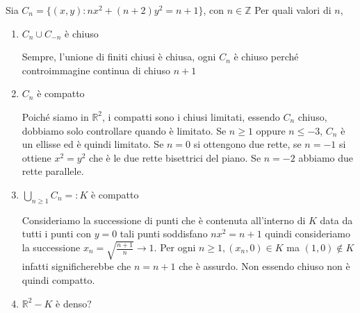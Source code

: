 \begin{example}
    Sia \(C_n = \{ (x, y) : nx^2 + (n+2)y^2 = n+1\} \), con \(n \in \mathbb{Z}\) 
    Per quali valori di \(n\),
\begin{enumerate}[label = \arabic*.]
    \item \(C_n \cup C_{-n}\) è chiuso

        Sempre, l'unione di finiti chiusi è chiusa, ogni \(C_n\) è chiuso
        perché controimmagine continua di chiuso \(n+1\) 
    \item \(C_n\) è compatto

        Poiché siamo in \(\mathbb{R}^{2}\), i compatti sono i chiusi limitati,
        essendo \(C_n\) chiuso, dobbiamo solo controllare quando è limitato. Se
        \(n \ge 1\) oppure \(n \le -3\), \(C_n\) è un ellisse ed è quindi limitato.
        Se \(n = 0\) si ottengono due rette, se \(n = -1\) si ottiene \(x^2 =
        y^2 \) che è le due rette bisettrici del piano. Se \(n = -2\) abbiamo due
        rette parallele.

    \item \(\bigcup_{n \ge 1} C_n =: K\) è compatto

        Consideriamo la successione di punti che è contenuta all'interno di
        \(K\) data da tutti i punti con \(y=0\) tali punti soddisfano \(nx^2 =
        n+1\) quindi consideriamo la successione \(x_n = \sqrt{\frac{n+1}{n}}
        \to 1\). Per ogni \(n \ge 1, (x_{n}, 0) \in K \)  ma \((1, 0) \not\in
        K\) infatti significherebbe che \(n = n+1\) che è assurdo. Non essendo
        chiuso non è quindi compatto.
    \item \(\mathbb{R}^2 - K\) è denso?
\end{enumerate}
\end{example}
